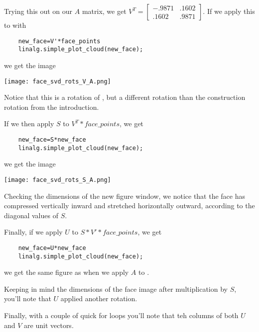 \documentclass{ximera}
\begin{document}
\begin{problem}
\begin{feedback}
  Trying this out on our $A$ matrix, we get $V^T=\begin{bmatrix}
    -.9871 & .1602 \\ .1602 & .9871
  \end{bmatrix}$. If we apply this to \facepoints with

  \begin{verbatim}
    new_face=V'*face_points
    linalg.simple_plot_cloud(new_face);
  \end{verbatim}

  we get the image

    \begin{center}
      \texttt{[image: face\_svd\_rots\_V\_A.png]}
    \end{center}

  Notice that this is a rotation of \facepoints, but a different rotation than the construction rotation from the introduction.
  
  If we then apply $S$ to $V^T*face\_points$, we get 

  \begin{verbatim}
    new_face=S*new_face
    linalg.simple_plot_cloud(new_face);
  \end{verbatim}

  we get the image

    \begin{center}
      \texttt{[image: face\_svd\_rots\_S\_A.png]}
    \end{center}

  Checking the dimensions of the new figure window, we notice that the face has compressed vertically inward and stretched horizontally outward, according to the diagonal values of $S$.

  Finally, if we apply $U$ to $S*V'*face\_points$, we get 

  \begin{verbatim}
    new_face=U*new_face
    linalg.simple_plot_cloud(new_face);
  \end{verbatim}

  we get the same figure as when we apply $A$ to \facepoints. 

  Keeping in mind the dimensions of the face image after multiplication by $S$, you'll note that $U$ applied another rotation. 

  Finally, with a couple of quick for loops you'll note that teh columns of both $U$ and $V$ are unit vectors. 


\end{feedback}
\end{problem}
\end{document}

